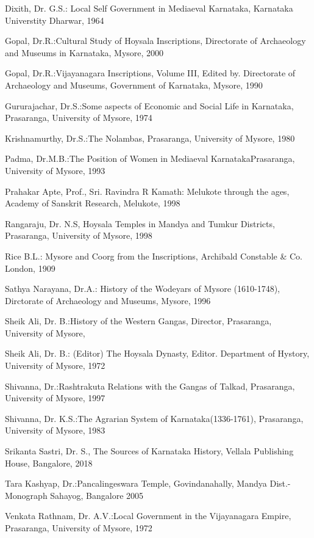 \noindent
Dixith, Dr. G.S.: Local Self Government in Mediaeval Karnataka, Karnataka Universtity Dharwar, 1964

\noindent
Gopal, Dr.R.:Cultural Study of Hoysala Inscriptions, Directorate of Archaeology and Museums in Karnataka, Mysore, 2000

\noindent
Gopal, Dr.R.:Vijayanagara Inscriptions, Volume III, Edited by. Directorate of Archaeology and Museums, Government of Karnataka, Mysore, 1990

\noindent
Gururajachar, Dr.S.:Some aspects of Economic and Social Life in Karnataka, Prasaranga, University of Mysore, 1974

\noindent
Krishnamurthy, Dr.S.:The Nolambas, Prasaranga, University of Mysore, 1980

\noindent
Padma, Dr.M.B.:The Position of Women in Mediaeval KarnatakaPrasaranga, University of Mysore, 1993

\noindent
Prahakar Apte, Prof., Sri. Ravindra R Kamath: Melukote through the ages, Academy of Sanskrit Research, Melukote, 1998

\noindent
Rangaraju, Dr. N.S, Hoysala Temples in Mandya and Tumkur Districts, Prasaranga, University of Mysore, 1998

\noindent
Rice B.L.: Mysore and Coorg from the Inscriptions, Archibald Constable \& Co. London, 1909

\noindent
Sathya Narayana, Dr.A.: History of the Wodeyars of Mysore (1610-1748), Dirctorate of Archaeology and Museums, Mysore, 1996

\noindent
Sheik Ali, Dr. B.:History of the Western Gangas, Director, Prasaranga, University of Mysore,

\noindent
Sheik Ali, Dr. B.: (Editor) The Hoysala Dynasty, Editor. Department of Hystory, University of Mysore, 1972

\noindent
Shivanna, Dr.:Rashtrakuta Relations with the Gangas of Talkad, Prasaranga, University of Mysore, 1997

\noindent
Shivanna, Dr. K.S.:The Agrarian System of Karnataka(1336-1761), Prasaranga, University of Mysore, 1983

\noindent
Srikanta Sastri, Dr. S., The Sources of Karnataka History, Vellala Publishing House, Bangalore, 2018

\noindent
Tara Kashyap, Dr.:Pancalingeswara Temple, Govindanahally, Mandya Dist.- Monograph Sahayog, Bangalore 2005

\noindent
Venkata Rathnam, Dr. A.V.:Local Government in the Vijayanagara Empire, Prasaranga, University of Mysore, 1972

